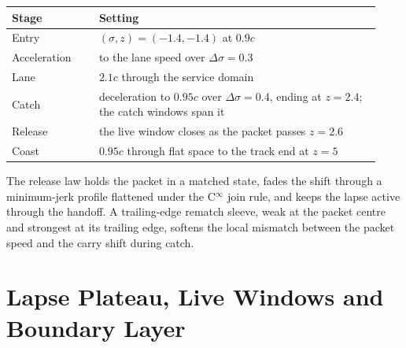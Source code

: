 \documentclass[11pt]{article}
\newcommand{\sig}{\sigma}
\begin{document}
\begin{longtable}{L{0.22\linewidth}L{0.71\linewidth}}
\toprule
\textbf{Stage} & \textbf{Setting} \\
\midrule
Entry & $(\sig,z)=(-1.4,-1.4)$ at $0.9c$ \\
Acceleration & to the lane speed over $\Delta\sig=0.3$ \\
Lane & $2.1c$ through the service domain \\
Catch & deceleration to $0.95c$ over $\Delta\sig=0.4$, ending at $z=2.4$; the catch windows span it \\
Release & the live window closes as the packet passes $z=2.6$ \\
Coast & $0.95c$ through flat space to the track end at $z=5$ \\
\bottomrule
\end{longtable}

The release law holds the packet in a matched state, fades the shift through a minimum-jerk profile flattened under the C$^\infty$ join rule, and keeps the lapse active through the handoff. A trailing-edge rematch sleeve, weak at the packet centre and strongest at its trailing edge, softens the local mismatch between the packet speed and the carry shift during catch.

\section{Lapse Plateau, Live Windows and Boundary Layer}
\end{document}
